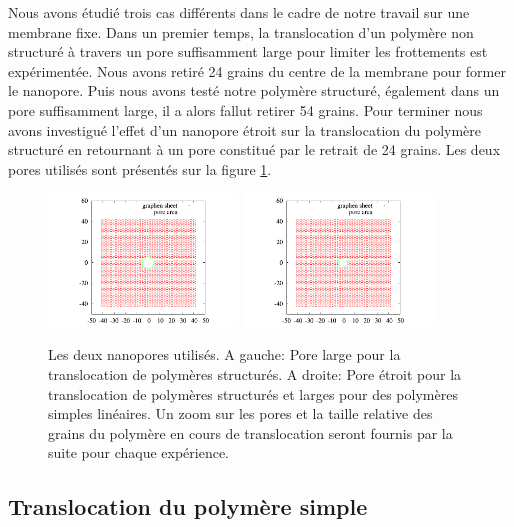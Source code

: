 Nous avons étudié trois cas différents dans le cadre de notre travail sur une membrane fixe. Dans un premier temps, la translocation d'un polymère non structuré à travers un pore suffisamment large pour limiter les frottements est expérimentée. Nous avons retiré 24 grains du centre de la membrane pour former le nanopore. Puis nous avons testé notre polymère structuré, également dans un pore suffisamment large, il a alors fallut retirer 54 grains. Pour terminer nous avons investigué l'effet d'un nanopore étroit sur la translocation du polymère structuré en retournant à un pore constitué par le retrait de 24 grains. Les deux pores utilisés sont présentés sur la figure \ref{bothpores}.
 \begin{figure}[H]
\begin{center}
\includegraphics[width=0.45\textwidth]{holebigger.pdf} \includegraphics[width=0.45\textwidth]{holesmall.pdf}

\caption[Nanopores utilisés]{Les deux nanopores utilisés. A gauche: Pore large pour la translocation de polymères structurés. A droite: Pore étroit pour la translocation de polymères structurés et larges pour des polymères simples linéaires. Un zoom sur les pores et la taille relative des grains du polymère en cours de translocation seront fournis par la suite  pour chaque expérience.}
\label{bothpores}
\end{center}
\end{figure}

\subsection{Translocation du polymère simple}


